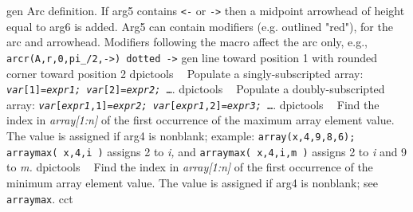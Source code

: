 %
  {gen}%
  {Arc definition.  If arg5 contains {\tt <-} or {\tt ->} then a midpoint
    arrowhead of height equal to arg6 is added. Arg5 can contain modifiers
    (e.g. outlined "red"), for the arc and arrowhead.  Modifiers following
    the macro affect the arc only,
    e.g., {\tt arcr(A,r,0,pi\_/2,->) dotted ->}%
   }%
%
  {gen}%
  {line toward position 1 with rounded corner toward position 2}%
%
  {dpictools}%
  {$\;\;$  Populate a singly-subscripted array:
    {\tt {\sl var}[1]={\sl expr1;} {\sl var}[2]={\sl expr2;} \ldots}.}%
%
  {dpictools}%
  {$\;\;$  Populate a doubly-subscripted array:
    {\tt {\sl var}[{\sl expr1},1]={\sl expr2;}%
         {\sl var}[{\sl expr1},2]={\sl expr3;} \ldots}.}%
%
  {dpictools}%
  {$\;\;$ Find the index in {\sl array[1:n]} of the first occurrence
   of the maximum array element value.  The value is assigned if arg4 is
   nonblank; example: 
   {\tt array(x,4,9,8,6); arraymax( x,4,i )}%
    assigns 2 to {\sl i,} and {\tt arraymax( x,4,i,m )}%
    assigns 2 to {\sl i} and 9 to {\sl m.}}%
%
  {dpictools}%
  {$\;\;$ Find the index in {\sl array[1:n]} of the first occurrence
   of the minimum array element value.  The value is assigned if arg4 is
   nonblank; see {\tt arraymax}.}%
%
  {cct}%
